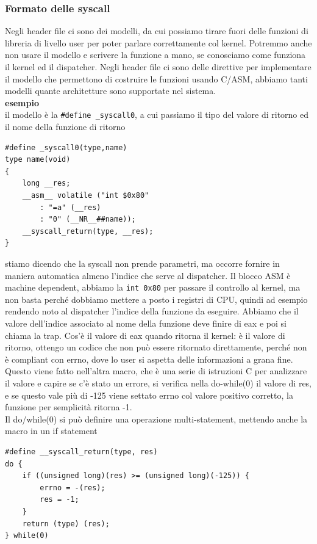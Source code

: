 \documentclass[12pt, oneside]{extbook}
\begin{document}
\subsubsection{Formato delle syscall}
Negli header file ci sono dei modelli, da cui possiamo tirare fuori delle funzioni di libreria di livello user per poter parlare correttamente col kernel. Potremmo anche non usare il modello e scrivere la funzione a mano, se conosciamo come funziona il kernel ed il dispatcher. Negli header file ci sono delle direttive per implementare il modello che permettono di costruire le funzioni usando C/ASM, abbiamo tanti modelli quante architetture sono supportate nel sistema.\\
\textbf{esempio}\\ il modello è la \texttt{\#define \_syscall0}, a cui passiamo il tipo del valore di ritorno ed il nome della funzione di ritorno
\begin{lstlisting}
#define _syscall0(type,name)
type name(void)
{
	long __res;
	__asm__ volatile ("int $0x80"
		: "=a" (__res)
		: "0" (__NR__##name));
	__syscall_return(type, __res);
}
\end{lstlisting}
stiamo dicendo che la syscall non prende parametri, ma occorre fornire in maniera automatica almeno l'indice che serve al dispatcher. Il blocco ASM è machine dependent, abbiamo la \texttt{int 0x80} per passare il controllo al kernel, ma non basta perché dobbiamo mettere a posto i registri di CPU, quindi ad esempio rendendo noto al dispatcher l'indice della funzione da eseguire. Abbiamo che il valore dell'indice associato al nome della funzione deve finire di eax e poi si chiama la trap. Cos'è il valore di eax quando ritorna il kernel: è il valore di ritorno, ottengo un codice che non può essere ritornato direttamente, perché non è compliant con errno, dove lo user si aspetta delle informazioni a grana fine.\\ Questo viene fatto nell'altra macro, che è una serie di istruzioni C per analizzare il valore e capire se c'è stato un errore, si verifica nella do-while(0) il valore di res, e se questo vale più di -125 viene settato errno col valore positivo corretto, la funzione per semplicità ritorna -1.\\ Il do/while(0) si può definire una operazione multi-statement, mettendo anche la macro in un if statement
\begin{lstlisting}
#define __syscall_return(type, res)
do {
	if ((unsigned long)(res) >= (unsigned long)(-125)) {
		errno = -(res);
		res = -1;
	}
	return (type) (res);
} while(0)
\end{lstlisting}
\end{document}
